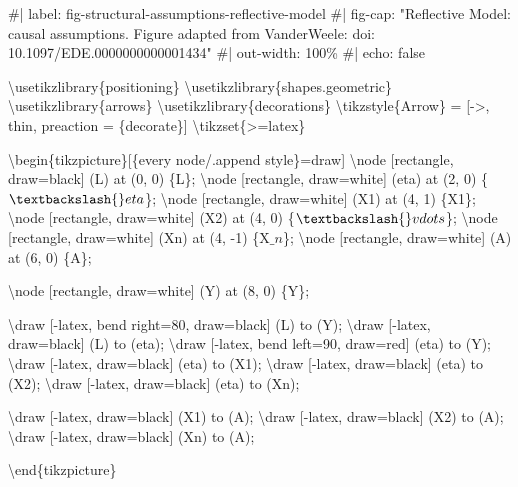 \documentclass[
  letterpaper,
  DIV=11,
  numbers=noendperiod]{scrartcl}
\newenvironment{Shaded}{\begin{snugshade}}{\end{snugshade}}
\newcommand{\NormalTok}[1]{\textcolor[rgb]{0.00,0.23,0.31}{#1}}
\begin{document}
\begin{Shaded}
\begin{Highlighting}[]
\NormalTok{\#| label: fig{-}structural{-}assumptions{-}reflective{-}model}
\NormalTok{\#| fig{-}cap: "Reflective Model: causal assumptions. Figure adapted from VanderWeele: doi: 10.1097/EDE.0000000000001434"}
\NormalTok{\#| out{-}width: 100\%}
\NormalTok{\#| echo: false}

\NormalTok{\textbackslash{}usetikzlibrary\{positioning\}}
\NormalTok{\textbackslash{}usetikzlibrary\{shapes.geometric\}}
\NormalTok{\textbackslash{}usetikzlibrary\{arrows\}}
\NormalTok{\textbackslash{}usetikzlibrary\{decorations\}}
\NormalTok{\textbackslash{}tikzstyle\{Arrow\} = [{-}\textgreater{}, thin, preaction = \{decorate\}]}
\NormalTok{\textbackslash{}tikzset\{\textgreater{}=latex\}}

\NormalTok{\textbackslash{}begin\{tikzpicture\}[\{every node/.append style\}=draw]}
\NormalTok{\textbackslash{}node [rectangle, draw=black] (L) at (0, 0) \{L\};}
\NormalTok{\textbackslash{}node [rectangle, draw=white] (eta) at (2, 0) \{$\textbackslash{}eta$\};}
\NormalTok{\textbackslash{}node [rectangle, draw=white] (X1) at (4, 1) \{X1\};}
\NormalTok{\textbackslash{}node [rectangle, draw=white] (X2) at (4, 0) \{$\textbackslash{}vdots$\};}
\NormalTok{\textbackslash{}node [rectangle, draw=white] (Xn) at (4, {-}1) \{X$\_n$\};}
\NormalTok{\textbackslash{}node [rectangle, draw=white] (A) at (6, 0) \{A\};}

\NormalTok{\textbackslash{}node [rectangle, draw=white] (Y) at (8, 0) \{Y\};}

\NormalTok{\textbackslash{}draw [{-}latex, bend right=80, draw=black] (L) to (Y);}
\NormalTok{\textbackslash{}draw [{-}latex, draw=black] (L) to (eta);}
\NormalTok{\textbackslash{}draw [{-}latex, bend left=90, draw=red] (eta) to (Y);}
\NormalTok{\textbackslash{}draw [{-}latex, draw=black] (eta) to (X1);}
\NormalTok{\textbackslash{}draw [{-}latex, draw=black] (eta) to (X2);}
\NormalTok{\textbackslash{}draw [{-}latex, draw=black] (eta) to (Xn);}

\NormalTok{\textbackslash{}draw [{-}latex, draw=black] (X1) to (A);}
\NormalTok{\textbackslash{}draw [{-}latex, draw=black] (X2) to (A);}
\NormalTok{\textbackslash{}draw [{-}latex, draw=black] (Xn) to (A);}

\NormalTok{\textbackslash{}end\{tikzpicture\}}
\end{Highlighting}
\end{Shaded}
\end{document}
